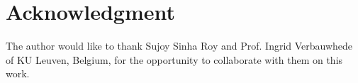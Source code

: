 \documentclass[conference]{IEEEtran_NCC}
\begin{document}



\section*{Acknowledgment}


The author would like to thank Sujoy Sinha Roy and Prof. Ingrid Verbauwhede of KU Leuven, Belgium, for the opportunity to collaborate with them on this work.



\end{document}
